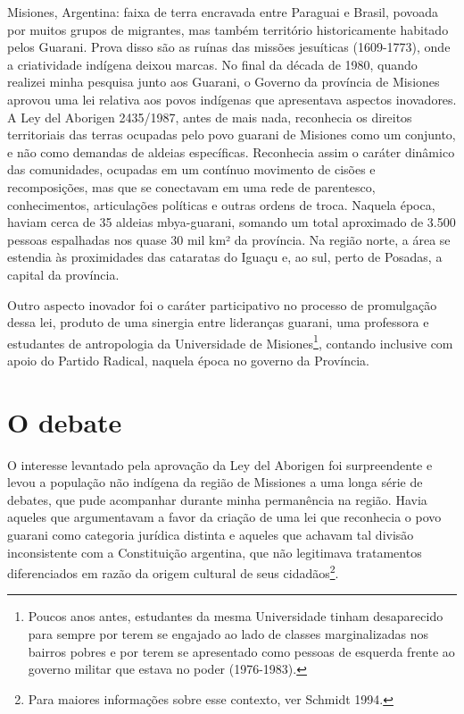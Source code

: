 Misiones, Argentina: faixa de terra encravada entre Paraguai e Brasil,
povoada por muitos grupos de migrantes, mas também território
historicamente habitado pelos Guarani. Prova disso são as ruínas das
missões jesuíticas (1609-1773), onde a criatividade indígena deixou
marcas. No final da década de 1980, quando realizei minha pesquisa
junto aos Guarani, o Governo da província de Misiones aprovou uma lei
relativa aos povos indígenas que apresentava aspectos inovadores. A Ley
del Aborigen 2435/1987, antes de mais nada, reconhecia os direitos
territoriais das terras ocupadas pelo povo guarani de Misiones como um
conjunto, e não como demandas de aldeias específicas. Reconhecia assim
o caráter dinâmico das comunidades, ocupadas em um contínuo movimento
de cisões e recomposições, mas que se conectavam em uma rede de
parentesco, conhecimentos, articulações políticas e outras ordens de
troca. Naquela época, haviam cerca de 35 aldeias mbya-guarani, somando
um total aproximado de 3.500 pessoas espalhadas nos quase 30 mil km² da
província. Na região norte, a área se estendia às proximidades das
cataratas do Iguaçu e, ao sul, perto de Posadas, a capital da
província.

Outro aspecto inovador foi o caráter participativo no processo de
promulgação dessa lei, produto de uma sinergia entre lideranças
guarani, uma professora e estudantes de antropologia da Universidade de
Misiones\footnote{Poucos anos antes, estudantes da mesma Universidade
tinham desaparecido para sempre por terem se engajado ao lado de
classes marginalizadas nos bairros pobres e por terem se apresentado
como pessoas de esquerda frente ao governo militar que estava no poder
(1976-1983).}, contando inclusive com apoio do Partido Radical, naquela
época no governo da Província. 

\section{O debate}

O interesse levantado pela aprovação da Ley del Aborigen foi
surpreendente e levou a população não indígena da região de Missiones a
uma longa série de debates, que pude acompanhar durante minha
permanência na região. Havia aqueles que argumentavam a favor da
criação de uma lei que reconhecia o povo guarani como categoria
jurídica distinta e aqueles que achavam tal divisão inconsistente com a
Constituição argentina, que não legitimava tratamentos diferenciados em
razão da origem cultural de seus cidadãos\footnote{Para maiores
informações sobre esse contexto, ver Schmidt 1994.}. 

